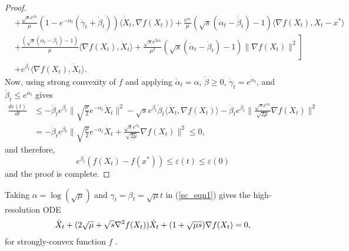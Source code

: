 \documentclass{article}
\theoremstyle{plain}
\theoremstyle{definition}
\theoremstyle{remark}
\begin{document}
\begin{proof}
\begin{align}
   & +\frac{\sqrt{s}e^{\alpha_t}}{\mu}(1-e^{-\alpha_t}(\dot \gamma_t+\dot \beta_t))\langle \dot X_t,\nabla f(X_t) \rangle + \frac{e^{\alpha_t }}{\mu}(\sqrt{s}(\dot \alpha_t-\dot \beta_t)-1)\langle \nabla f(X_t) ,X_t-x^*\rangle\nonumber\\
   & \left.+ \frac{(\sqrt{s}(\dot \alpha_t-\dot \beta_t)-1)}{\mu}\langle \nabla f(X_t),\dot X_t \rangle+\frac{\sqrt{s}e^{2\alpha_t}}{\mu^2}(\sqrt{s}(\dot \alpha_t-\dot \beta_t)-1)\|\nabla f(X_t)\|^2\right]\nonumber\\
   & + e^{\beta_t}\langle \nabla f(X_t),\dot X_t \rangle.
    \end{align}
    Now, using strong convexity of $f$ and applying $\dot \alpha_t=\alpha$, $\dot \beta\geq 0$, $\dot \gamma_t=e^{\alpha_t}$, and $\dot \beta_t\leq e^{\alpha_t}$ gives
    \begin{align}\label{thm32_eqn_4}
        \frac{d\varepsilon(t)}{dt}&\leq-\dot \beta_t e^{\beta_t}\|\sqrt{\frac{\mu}{2}}e^{-\alpha_t}\dot X_t\|^2-\sqrt{s}e^{\beta_t}\dot \beta_t\langle \dot X_t,\nabla f(X_t) \rangle-\dot \beta_t e^{\beta_t}\|\frac{\sqrt{s}e^{\alpha_t}}{\sqrt{2\mu}}\nabla f(X_t)\|^2\nonumber\\
        &=-\dot \beta_t e^{\beta_t} \|    \sqrt{\frac{\mu}{2}}e^{-\alpha_t}\dot X_t+  \frac{\sqrt{s}e^{\alpha_t}}{\sqrt{2\mu}}\nabla f(X_t)\|^2\leq 0,
    \end{align}
    and therefore, 
    $$e^{\beta_t}(f(X_t)-f(x^*))\leq \varepsilon(t)\leq \varepsilon(0)$$
    and the proof is complete.
\end{proof}
Taking $\alpha=\log(\sqrt{\mu})$ and $\gamma_t=\beta_t=\sqrt{\mu}t$ in (\ref{sc_eqn1}) gives the high-resolution ODE 
\begin{align}\label{high-res-ODE}
    \Ddot{X}_t+(2\sqrt{\mu}+\sqrt{s}\nabla^2 f(X_t))\dot X_t +(1+\sqrt{\mu s })\nabla f(X_t)=0,
\end{align}
for strongly-convex function $f$ \cite{Shi2021UnderstandingTA}.
\end{document}

